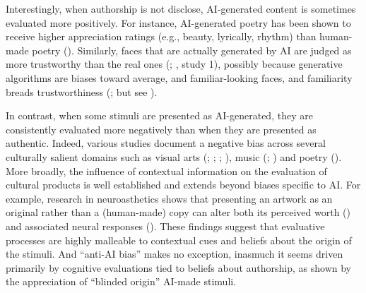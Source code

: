 \documentclass[
  jou,
  floatsintext,
  longtable,
  nolmodern,
  notxfonts,
  notimes,
  colorlinks=true,linkcolor=blue,citecolor=blue,urlcolor=blue]{apa7}
\begin{document}
Interestingly, when authorship is not disclose, AI-generated content is
sometimes evaluated more positively. For instance, AI-generated poetry
has been shown to receive higher appreciation ratings (e.g., beauty,
lyrically, rhythm) than human-made poetry
(). Similarly, faces
that are actually generated by AI are judged as more trustworthy than
the real ones (; ,
study 1), possibly because generative algorithms are biases toward
average, and familiar-looking faces, and familiarity breads
trustworthiness (; but
see ).

In contrast, when some stimuli are presented as AI-generated, they are
consistently evaluated more negatively than when they are presented as
authentic. Indeed, various studies document a negative bias across
several culturally salient domains such as visual arts
(;
;
;
), music
(;
) and poetry
(). More broadly,
the influence of contextual information on the evaluation of cultural
products is well established and extends beyond biases specific to AI.
For example, research in neuroasthetics shows that presenting an artwork
as an original rather than a (human-made) copy can alter both its
perceived worth ()
and associated neural responses (). These findings suggest that evaluative processes are highly
malleable to contextual cues and beliefs about the origin of the
stimuli. And ``anti-AI bias'' makes no exception, inasmuch it seems
driven primarily by cognitive evaluations tied to beliefs about
authorship, as shown by the appreciation of ``blinded origin'' AI-made
stimuli.
\end{document}
